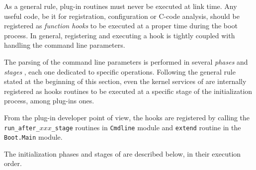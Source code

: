 As a general rule, plug-in routines must never be executed at link time. Any
useful code, be it for registration, configuration or \textsf{C}-code analysis,
should be registered as \emph{function hooks} to be executed at a proper time
during the \framac boot process. In general, registering and executing a hook is
tightly coupled with handling the command line parameters.

The parsing of the command line parameters is performed in several
\emph{phases} and \emph{stages}
,
each one dedicated to specific operations.
Following the general rule stated at the beginning of this section, even
the kernel services of \framac are internally registered as hooks routines to
be executed at a specific stage of the initialization process, among plug-ins
ones.

From the plug-in developer point of view, the hooks are registered by
calling the \texttt{run\_after\_$xxx$\_stage} routines in
\texttt{Cmdline} module and \texttt{extend} routine
in the \texttt{Boot.Main} module.

The initialization phases and stages of \framac are described below, in
their execution order.

